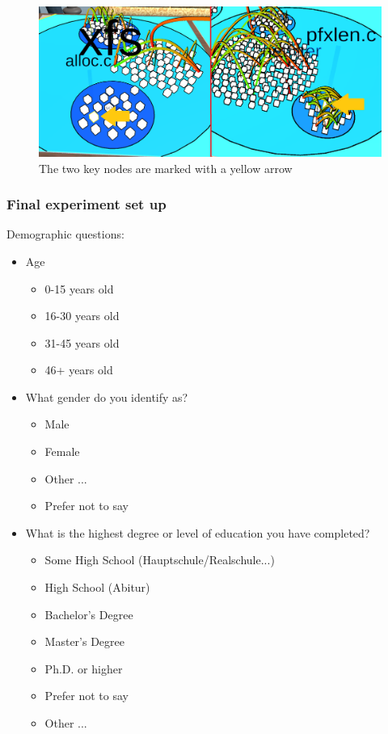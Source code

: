\begin{figure}[htb]
    \centering
    \includegraphics[width=1\textwidth]{Evaluation/img/task1.png}
    \caption{The two key nodes are marked with a yellow arrow}\label{fig:task1}
\end{figure}

\subsubsection{Final experiment set up}

Demographic questions:
\begin{itemize}
    \item Age
    \begin{itemize}
        \item 0-15 years old
        \item 16-30 years old
        \item 31-45 years old
        \item 46+ years old
    \end{itemize}
    \item What gender do you identify as?
    \begin{itemize}
        \item Male
        \item Female
        \item Other ...
        \item Prefer not to say
    \end{itemize}
    \item What is the highest degree or level of education you have completed?
    \begin{itemize}
        \item Some High School (Hauptschule/Realschule...)
        \item High School (Abitur)
        \item Bachelor's Degree
        \item Master's Degree
        \item Ph.D. or higher
        \item Prefer not to say
        \item Other ...
    \end{itemize}
\end{itemize}

